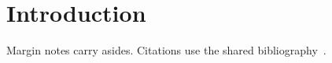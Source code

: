 \chapter{Introduction}
\label{ch:intro}

Margin notes carry asides. Citations use the shared
bibliography~\citep{lamport1994latex}.
